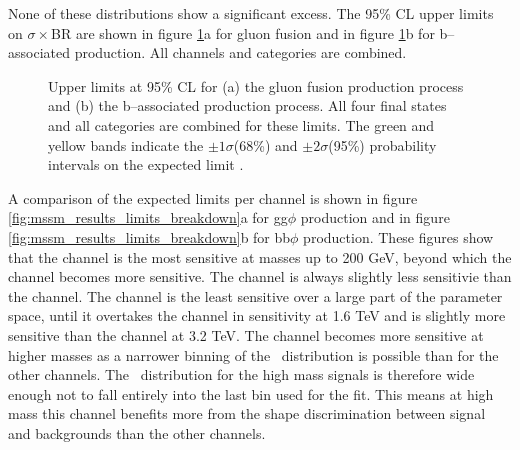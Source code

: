 None of these distributions show a significant excess. The
95\% CL upper limits on $\sigma\times$BR are shown in figure \ref{fig:mssm_results_limits}a
for gluon fusion and in figure \ref{fig:mssm_results_limits}b for b--associated
production. All channels and categories are combined. 
\begin{figure}[h!]
\begin{center}
\end{center}
\caption{Upper limits at 95\% CL for (a) the gluon fusion production
process and (b) the b--associated production process. All four final states and 
all categories are combined for these limits. The green and yellow bands indicate
the $\pm 1\sigma$(68\%) and $\pm 2\sigma$(95\%) probability intervals on the expected limit \cite{CMS-PAS-HIG-16-037}.}
\label{fig:mssm_results_limits}
\end{figure}

A comparison of the expected limits
per channel is shown in figure \ref{fig:mssm_results_limits_breakdown}a for gg$\phi$ production
and in figure \ref{fig:mssm_results_limits_breakdown}b for bb$\phi$ production.
These figures show that the \mutau channel is the most sensitive at masses up to 
200 GeV, beyond which the \tautau channel becomes more sensitive. The \etau
channel is always slightly less sensitivie than the \mutau channel. The \emu channel
is the least sensitive over a large part of the parameter space, until it overtakes the 
\etau channel in sensitivity at 1.6 TeV and is slightly more sensitive than the
\mutau channel at 3.2 TeV. The \emu channel becomes more sensitive at higher masses as
a narrower binning of the \mTtot~distribution is possible than for the other channels.
The \mTtot~distribution for the high mass signals is therefore wide enough not to
fall entirely into the last bin used for the fit. This means at high mass this channel
benefits more from the shape discrimination between signal and backgrounds than
the other channels.

